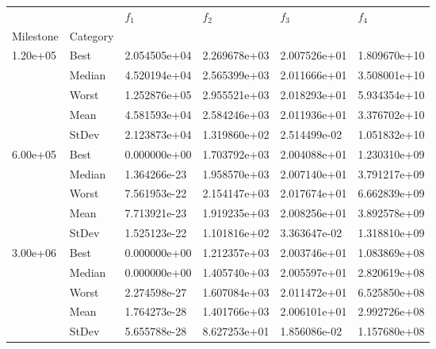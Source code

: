 \begin{tabular}{llllll}
\toprule
         &      &      $f_{1}$ &      $f_{2}$ &      $f_{3}$ &      $f_{4}$ \\
Milestone & Category &              &              &              &              \\
\midrule
\multirow{5}{*}{1.20e+05} & Best & 2.054505e+04 & 2.269678e+03 & 2.007526e+01 & 1.809670e+10 \\
         & Median & 4.520194e+04 & 2.565399e+03 & 2.011666e+01 & 3.508001e+10 \\
         & Worst & 1.252876e+05 & 2.955521e+03 & 2.018293e+01 & 5.934354e+10 \\
         & Mean & 4.581593e+04 & 2.584246e+03 & 2.011936e+01 & 3.376702e+10 \\
         & StDev & 2.123873e+04 & 1.319860e+02 & 2.514499e-02 & 1.051832e+10 \\
\cline{1-6}
\multirow{5}{*}{6.00e+05} & Best & 0.000000e+00 & 1.703792e+03 & 2.004088e+01 & 1.230310e+09 \\
         & Median & 1.364266e-23 & 1.958570e+03 & 2.007140e+01 & 3.791217e+09 \\
         & Worst & 7.561953e-22 & 2.154147e+03 & 2.017674e+01 & 6.662839e+09 \\
         & Mean & 7.713921e-23 & 1.919235e+03 & 2.008256e+01 & 3.892578e+09 \\
         & StDev & 1.525123e-22 & 1.101816e+02 & 3.363647e-02 & 1.318810e+09 \\
\cline{1-6}
\multirow{5}{*}{3.00e+06} & Best & 0.000000e+00 & 1.212357e+03 & 2.003746e+01 & 1.083869e+08 \\
         & Median & 0.000000e+00 & 1.405740e+03 & 2.005597e+01 & 2.820619e+08 \\
         & Worst & 2.274598e-27 & 1.607084e+03 & 2.011472e+01 & 6.525850e+08 \\
         & Mean & 1.764273e-28 & 1.401766e+03 & 2.006101e+01 & 2.992726e+08 \\
         & StDev & 5.655788e-28 & 8.627253e+01 & 1.856086e-02 & 1.157680e+08 \\
\bottomrule
\end{tabular}
